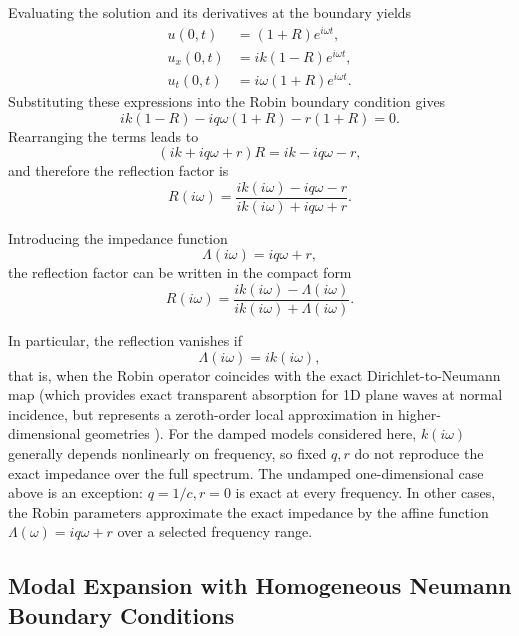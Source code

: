 \documentclass{Configuration_Files/PoliMi3i_thesis}
\newif\ifshowthesischanges
\DeclareRobustCommand{\thesischange}[2]{%
    \ifshowthesischanges
        \textcolor{#1}{#2}%
    \else
        #2%
    \fi
}
\def\thesischange#1#2{#2}%
\begin{document}
Evaluating the solution and its derivatives at the boundary yields
\begin{align*}
u(0,t)
&=
(1+R)e^{i\omega t},
\\
u_x(0,t)
&=
ik(1-R)e^{i\omega t},
\\
u_t(0,t)
&=
i\omega(1+R)e^{i\omega t}.
\end{align*}
Substituting these expressions into the Robin boundary condition gives
\begin{equation*}
ik(1-R)
-iq\omega(1+R)
-r(1+R)
=
0.
\end{equation*}
Rearranging the terms leads to
\begin{equation*}
(ik+iq\omega+r)R
=
ik-iq\omega-r,
\end{equation*}
and therefore the reflection factor is
\begin{equation}
R(i\omega)
=
\frac{
ik(i\omega)-iq\omega-r
}
{
ik(i\omega)+iq\omega+r
}.
\label{eq:reflection_cont}
\end{equation}

Introducing the impedance function
\begin{equation*}
\Lambda(i\omega)
=
iq\omega+r,
\end{equation*}
the reflection factor can be written in the compact form
\begin{equation*}
R(i\omega)
=
\frac{
ik(i\omega)-\Lambda(i\omega)
}
{
ik(i\omega)+\Lambda(i\omega)
}.
\end{equation*}

In particular, the reflection vanishes if
\begin{equation*}
\Lambda(i\omega)=ik(i\omega),
\end{equation*}
\thesischange{blue}{that is, when the Robin operator coincides with the exact Dirichlet-to-Neumann map (which provides exact transparent absorption for 1D plane waves at normal incidence, but represents a zeroth-order local approximation in higher-dimensional geometries \cite{dolean_introduction_2015}).} For the damped models considered here, \(k(i\omega)\) generally depends nonlinearly on frequency, so fixed \(q,r\) do not reproduce the exact impedance over the full spectrum. The undamped one-dimensional case above is an exception: \(q=1/c, r=0\) is exact at every frequency. In other cases, the Robin parameters approximate the exact impedance by the affine function \(\Lambda(\omega)=iq\omega+r\) over a selected frequency range.

\subsection{Modal Expansion with Homogeneous Neumann Boundary Conditions} \label{sec:modal_expansion}
\end{document}
